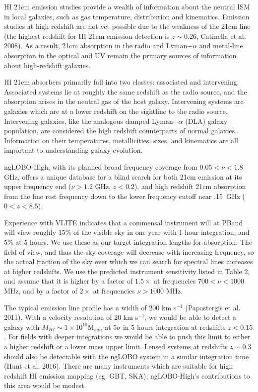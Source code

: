 \documentclass[11pt]{article}
\begin{document}
HI 21cm emission studies provide a wealth of information about the neutral ISM in local galaxies, such as gas temperature, distribution and kinematics. Emission studies at high redshift are not yet possible due to the weakness of the 21cm line (the highest redshift for HI 21cm emission detection is $z\sim0.26$, Catinella et al. 2008).    As a result, 21cm absorption in the radio and Lyman$-\alpha$ and metal-line absorption in the optical and UV remain the primary sources of information about high-redshift galaxies.   

HI 21cm absorbers primarily fall into two classes: associated and intervening. Associated systems lie at roughly the same redshift as the radio source, and the absorption arises in the neutral gas of the host galaxy. Intervening systems are galaxies which are at a lower redshift on the sightline to the radio source. Intervening galaxies, like the analogous damped Lyman$-\alpha$ (DLA) galaxy population, are considered the high redshift counterparts of normal galaxies. Information on their temperatures, metallicities, sizes, and kinematics are all important to understanding galaxy evolution. 

ngLOBO-High, with its planned broad frequency coverage from $0.05 < \nu < 1.8$ GHz, offers a unique database for a blind search for both 21cm emission at its upper frequency end ($\nu > 1.2$ GHz, $z < 0.2$), and high redshift 21cm absorption from the line rest frequency down to the lower frequency cutoff near .15~GHz ($0 < z < 8.5$).   

Experience with VLITE indicates that a commensal instrument will at PBand will view roughly $15\%$ of the visible sky in one year with 1 hour integration, and $5\%$ at 5 hours.  We use these as our target integration lengths for absorption.  The field of view, and thus the sky coverage will decrease with increasing frequency, so the actual fraction of the sky over which we can search for spectral lines increases at higher redshifts.  We use the predicted instrument sensitivity listed in Table 2, and assume that it is higher by a factor of $1.5\times$ at frequencies $700 < \nu < 1000$ MHz, and by a factor of $2\times$ at frequencies $\nu > 1000$ MHz.


The typical emission line profile has a width of $200$ km s$^{-1}$ (Papastergis et al. 2011).  With a velocity resolution of $20$ km s$^{-1}$, we would be able to detect a galaxy with $M_{HI} \sim 1 \times 10^{10}$M$_{sun}$ at $5\sigma$ in 5 hours integration at redshifts $z < 0.15$.  For fields with deeper integrations we would be able to push this limit to either a higher redshift or a lower mass upper limit.  Lensed systems at redshifts $z \sim 0.3$ should also be detectable with the ngLOBO system in a similar integration time (Hunt et al. 2016).  There are many instruments which are suitable for high redshift HI emission mapping (eg. GBT, SKA); ngLOBO-High's contributions to this area would be modest.
\end{document}
